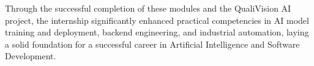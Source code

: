 Through the successful completion of these modules and the QualiVision AI project, the internship significantly enhanced practical competencies in AI model training and deployment, backend engineering, and industrial automation, laying a solid foundation for a successful career in Artificial Intelligence and Software Development.

\newpage
